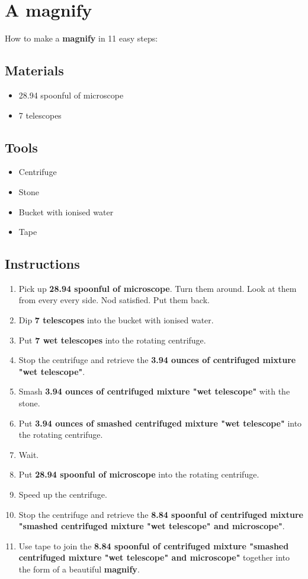 \documentclass{article}
\begin{document}
\section{A magnify}How to make a \textbf{magnify} in 11 easy steps:

\subsection{Materials}\begin{itemize}
\item 
28.94 spoonful of microscope
\item 
7 telescopes
\end{itemize}
\subsection{Tools}\begin{itemize}
\item 
Centrifuge
\item 
Stone
\item 
Bucket with ionised water
\item 
Tape
\end{itemize}
\subsection{Instructions}\begin{enumerate}
\item 
Pick up \textbf{28.94 spoonful of microscope}. Turn them around. Look at them from every every side. Nod satisfied. Put them back.
\item 
Dip \textbf{7 telescopes} into the bucket with ionised water.
\item 
Put \textbf{7 wet telescopes} into the rotating centrifuge.
\item 
Stop the centrifuge and retrieve the \textbf{3.94 ounces of centrifuged mixture "wet telescope"}.
\item 
Smash \textbf{3.94 ounces of centrifuged mixture "wet telescope"} with the stone.
\item 
Put \textbf{3.94 ounces of smashed centrifuged mixture "wet telescope"} into the rotating centrifuge.
\item 
Wait.
\item 
Put \textbf{28.94 spoonful of microscope} into the rotating centrifuge.
\item 
Speed up the centrifuge.
\item 
Stop the centrifuge and retrieve the \textbf{8.84 spoonful of centrifuged mixture "smashed centrifuged mixture "wet telescope" and microscope"}.
\item 
Use tape to join the \textbf{8.84 spoonful of centrifuged mixture "smashed centrifuged mixture "wet telescope" and microscope"} together into the form of a beautiful \textbf{magnify}.
\end{enumerate}
\newpage
\end{document}
